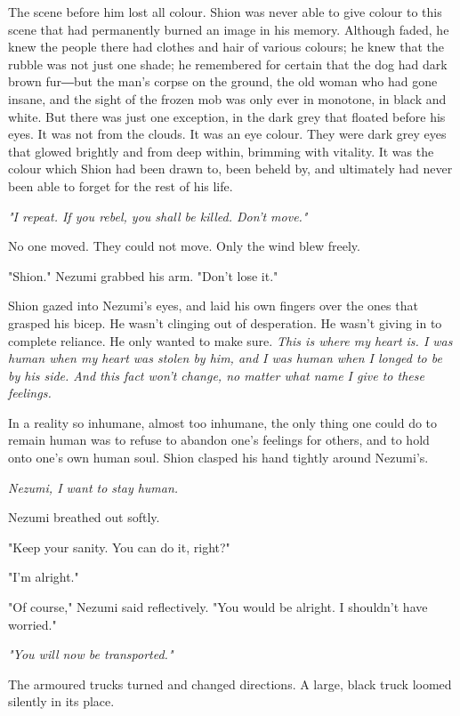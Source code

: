 The scene before him lost all colour. Shion was never able to give
colour to this scene that had permanently burned an image in his memory.
Although faded, he knew the people there had clothes and hair of various
colours; he knew that the rubble was not just one shade; he remembered
for certain that the dog had dark brown fur―but the man's corpse on the
ground, the old woman who had gone insane, and the sight of the frozen
mob was only ever in monotone, in black and white. But there was just
one exception, in the dark grey that floated before his eyes. It was not
from the clouds. It was an eye colour. They were dark grey eyes that
glowed brightly and from deep within, brimming with vitality. It was the
colour which Shion had been drawn to, been beheld by, and ultimately had
never been able to forget for the rest of his life.

\emph{"I repeat. If you rebel, you shall be killed. Don't move."}

No one moved. They could not move. Only the wind blew freely.

"Shion." Nezumi grabbed his arm. "Don't lose it."

Shion gazed into Nezumi's eyes, and laid his own fingers over the ones
that grasped his bicep. He wasn't clinging out of desperation. He wasn't
giving in to complete reliance. He only wanted to make sure. \emph{This is
where my heart is. I was human when my heart was stolen by him, and I
was human when I longed to be by his side. And this fact won't change,
no matter what name I give to these feelings.}

In a reality so inhumane, almost too inhumane, the only thing one could
do to remain human was to refuse to abandon one's feelings for others,
and to hold onto one's own human soul. Shion clasped his hand tightly
around Nezumi's.

\emph{Nezumi, I want to stay human.}

Nezumi breathed out softly.

"Keep your sanity. You can do it, right?"

"I'm alright."

"Of course," Nezumi said reflectively. "You would be alright. I
shouldn't have worried."

\emph{"You will now be transported."}

The armoured trucks turned and changed directions. A large, black truck
loomed silently in its place.